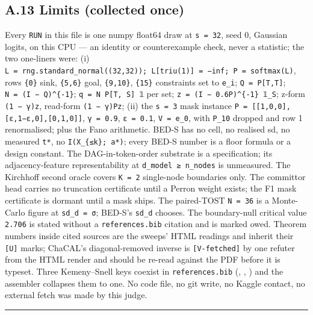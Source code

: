 \documentclass[11pt,a4paper]{article}
\theoremstyle{plain}
\theoremstyle{definition}
\theoremstyle{remark}
\begin{document}
\subsection{A.13 Limits (collected
once)}\label{a.13-limits-collected-once}

Every \texttt{RUN} in this file is one numpy float64 draw at
\texttt{s\ =\ 32}, seed 0, Gaussian logits, on this CPU --- an identity
or counterexample check, never a statistic; the two one-liners were: (i)
\texttt{L\ =\ rng.standard\_normal((32,32));\ L{[}triu(1){]}\ =\ −inf;\ P\ =\ softmax(L)},
rows \texttt{\{0\}} sink, \texttt{\{5,6\}} goal, \texttt{\{9,10\}},
\texttt{\{15\}} constraints set to \texttt{e\_i};
\texttt{Q\ =\ P{[}T,T{]}}; \texttt{N\ =\ (I\ −\ Q)\^{}\{-1\}};
\texttt{q\ =\ N\ P{[}T,\ S{]}\ 𝟙} per set;
\texttt{z\ =\ (I\ −\ 0.6P)\^{}\{-1\}\ 𝟙\_S}; z-form \texttt{(1\ −\ γ)z},
read-form \texttt{(1\ −\ γ)Pz}; (ii) the \texttt{s\ =\ 3} mask instance
\texttt{P\ =\ {[}{[}1,0,0{]},{[}ε,1−ε,0{]},{[}0,1,0{]}{]}},
\texttt{γ\ =\ 0.9}, \texttt{ε\ =\ 0.1}, \texttt{V\ =\ e\_0}, with
\texttt{P\_10} dropped and row 1 renormalised; plus the Fano arithmetic.
BED-S has no cell, no realised sd, no measured \texttt{t*}, no
\texttt{I(X\_\{≤k\};\ a*)}; every BED-S number is a floor formula or a
design constant. The DAG-in-token-order substrate is a specification;
its adjacency-feature representability at \texttt{d\_model\ ≥\ n\_nodes}
is unmeasured. The Kirchhoff second oracle covers \texttt{K\ =\ 2}
single-node boundaries only. The committor head carries no truncation
certificate until a Perron weight exists; the F1 mask certificate is
dormant until a mask ships. The paired-TOST \texttt{N\ =\ 36} is a
Monte-Carlo figure at \texttt{sd\_d\ =\ σ}; BED-S's \texttt{sd\_d}
chooses. The boundary-null critical value \texttt{2.706} is stated
without a \texttt{references.bib} citation and is marked owed. Theorem
numbers inside cited sources are the sweeps' HTML readings and inherit
their \texttt{{[}U{]}} marks; ChaCAL's diagonal-removed inverse is
\texttt{{[}V-fetched{]}} by one refuter from the HTML render and should
be re-read against the PDF before it is typeset. Three Kemeny--Snell
keys coexist in \texttt{references.bib}
(\citep{kemeny-1960-finitemarkov}, \citep{kemeny-1976-finite},
\citep{kemeny-1976-finitemarkov}) and the assembler collapses them to
one. No code file, no git write, no Kaggle contact, no external fetch
was made by this judge.

\begin{center}\rule{0.5\linewidth}{0.5pt}\end{center}
\end{document}
